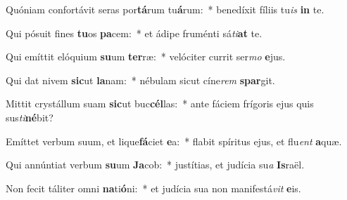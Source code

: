 \item Quóniam confortávit seras por\textbf{tá}rum tu\textbf{á}rum:~* benedíxit fíliis tu\textit{is} \textbf{in} te.
\item Qui pósuit fines \textbf{tu}os \textbf{pa}cem:~* et ádipe fruménti sá\textit{ti}\textbf{at} te.
\item Qui emíttit elóquium \textbf{su}um \textbf{ter}ræ:~* velóciter currit ser\textit{mo} \textbf{e}jus.
\item Qui dat nivem \textbf{sic}ut \textbf{la}nam:~* nébulam sicut cíne\textit{rem} \textbf{spar}git.
\item Mittit crystállum suam \textbf{sic}ut buc\textbf{cél}las:~* ante fáciem frígoris ejus quis sus\textit{ti}\textbf{né}bit?
\item Emíttet verbum suum, et lique\textbf{fá}ciet \textbf{e}a:~* flabit spíritus ejus, et flu\textit{ent} \textbf{a}quæ.
\item Qui annúntiat verbum \textbf{su}um \textbf{Ja}cob:~* justítias, et judícia su\textit{a} \textbf{Is}raël.
\item Non fecit táliter omni \textbf{na}ti\textbf{ó}ni:~* et judícia sua non manifestá\textit{vit} \textbf{e}is.
